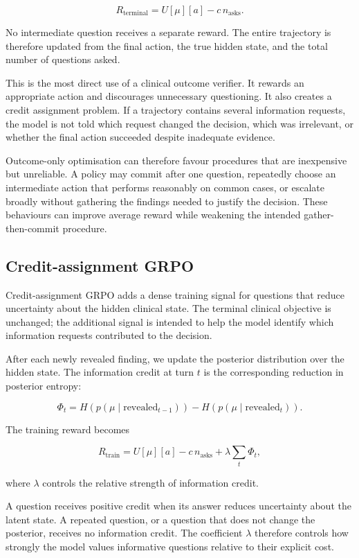 \documentclass{article}
\begin{document}
\[
R_{\text{terminal}}
=
U[\mu][a] - c\,n_{\text{asks}}.
\]

No intermediate question receives a separate reward. The entire trajectory is
therefore updated from the final action, the true hidden state, and the total number
of questions asked.

This is the most direct use of a clinical outcome verifier. It rewards an
appropriate action and discourages unnecessary questioning. It also creates a
credit assignment problem. If a trajectory contains several information requests,
the model is not told which request changed the decision, which was irrelevant,
or whether the final action succeeded despite inadequate evidence.

Outcome-only optimisation can therefore favour procedures that are inexpensive but
unreliable. A policy may commit after one question, repeatedly choose an
intermediate action that performs reasonably on common cases, or escalate broadly
without gathering the findings needed to justify the decision. These behaviours
can improve average reward while weakening the intended gather-then-commit
procedure.

\subsection{Credit-assignment GRPO}
\label{subsec:credit-assignment}

Credit-assignment GRPO adds a dense training signal for questions that reduce
uncertainty about the hidden clinical state. The terminal clinical objective is
unchanged; the additional signal is intended to help the model identify which
information requests contributed to the decision.

After each newly revealed finding, we update the posterior distribution over the
hidden state. The information credit at turn $t$ is the corresponding reduction
in posterior entropy:

\[
\Phi_t
=
H\!\left(
p(\mu \mid \text{revealed}_{t-1})
\right)
-
H\!\left(
p(\mu \mid \text{revealed}_{t})
\right).
\]

The training reward becomes

\[
R_{\text{train}}
=
U[\mu][a]
-
c\,n_{\text{asks}}
+
\lambda \sum_t \Phi_t,
\]

where $\lambda$ controls the relative strength of information credit.

A question receives positive credit when its answer reduces uncertainty about the
latent state. A repeated question, or a question that does not change the
posterior, receives no information credit. The coefficient $\lambda$ therefore
controls how strongly the model values informative questions relative to their
explicit cost.
\end{document}
